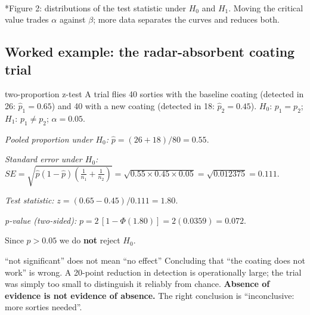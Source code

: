 \documentclass[11pt]{article}
\begin{document}
\begin{center}\\*{\small\color{GreyN}Figure 2: distributions of the test statistic under $H_0$ and $H_1$. Moving the critical value trades $\alpha$ against $\beta$; more data separates the curves and reduces both.}\end{center}

\subsection{Worked example: the radar-absorbent coating trial}
\begin{example}{two-proportion z-test}
A trial flies 40 sorties with the baseline coating (detected in 26: $\hat p_1=0.65$) and 40 with a new coating (detected in 18: $\hat p_2=0.45$). $H_0$: $p_1=p_2$; $H_1$: $p_1\ne p_2$; $\alpha=0.05$.

\emph{Pooled proportion under $H_0$:} $\hat p=(26+18)/80=0.55$.

\emph{Standard error under $H_0$:} $SE=\sqrt{\hat p(1-\hat p)\left(\tfrac{1}{n_1}+\tfrac{1}{n_2}\right)}=\sqrt{0.55\times0.45\times0.05}=\sqrt{0.012375}=0.111$.

\emph{Test statistic:} $z=(0.65-0.45)/0.111=1.80$.

\emph{p-value (two-sided):} $p=2\,[1-\Phi(1.80)]=2(0.0359)=0.072$.

Since $p>0.05$ we do \textbf{not} reject $H_0$.
\end{example}

\begin{pitfall}{``not significant'' does not mean ``no effect''}
Concluding that ``the coating does not work'' is wrong. A 20-point reduction in detection is operationally large; the trial was simply too small to distinguish it reliably from chance. \textbf{Absence of evidence is not evidence of absence.} The right conclusion is ``inconclusive: more sorties needed''.
\end{pitfall}
\end{document}
